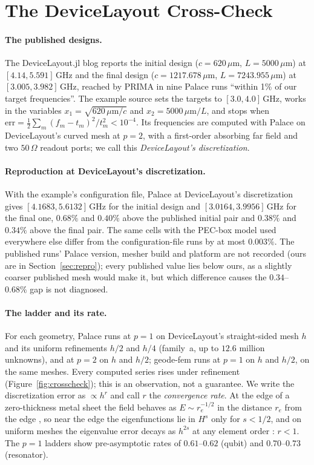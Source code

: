 \documentclass{anvil-paper}
\begin{document}
\section{The DeviceLayout Cross-Check}
\label{sec:crosscheck}

\paragraph{The published designs.}
The DeviceLayout.jl blog \citep{devicelayout-blog} reports the initial
design ($c = 620\,\mu$m, $L = 5000\,\mu$m) at $[4.14, 5.591]$\,GHz and
the final design ($c = 1217.678\,\mu$m, $L = 7243.955\,\mu$m) at
$[3.005, 3.982]$\,GHz, reached by PRIMA in nine Palace runs ``within 1\% of
our target frequencies''. The example source \citep{devicelayout-example}
sets the targets to $[3.0, 4.0]$\,GHz, works in the variables $x_1 =
\sqrt{620\,\mu\mathrm{m}/c}$ and $x_2 = 5000\,\mu\mathrm{m}/L$, and stops
when $\mathrm{err} = \frac12\sum_m (f_m - t_m)^2/t_m^2 < 10^{-4}$. Its
frequencies are computed with Palace on DeviceLayout's curved mesh at
$p = 2$, with a first-order absorbing far field and two
$50\,\Omega$ readout ports; we call this \emph{DeviceLayout's
discretization}.

\paragraph{Reproduction at DeviceLayout's discretization.}
With the example's configuration file, Palace at DeviceLayout's
discretization gives $[4.1683, 5.6132]$\,GHz for the initial design
and $[3.0164, 3.9956]$\,GHz for the final one, $0.68\%$ and $0.40\%$
above the published initial pair and $0.38\%$ and $0.34\%$ above the
final pair. The same cells with the PEC-box model used everywhere else
differ from the configuration-file runs by at most $0.003\%$. The
published runs' Palace version, mesher build and platform are not
recorded (ours are in Section~\ref{sec:repro}); every published value lies
below ours, as a slightly coarser published mesh would make it, but which
difference causes the $0.34$--$0.68\%$ gap is not diagnosed.

\paragraph{The ladder and its rate.}
For each geometry, Palace runs at $p = 1$ on DeviceLayout's straight-sided
mesh $h$ and its uniform refinements $h/2$ and $h/4$ (family~a, up to
$12.6$ million unknowns), and at $p = 2$ on $h$ and $h/2$;
geode-fem runs at $p = 1$ on $h$ and $h/2$, on the same meshes. Every
computed series rises under refinement (Figure~\ref{fig:crosscheck}); this
is an observation, not a guarantee. We write the discretization error as
$\propto h^{r}$ and call $r$ the \emph{convergence rate}. At the edge of a
zero-thickness metal sheet the field behaves as $E \sim r_e^{-1/2}$ in the
distance $r_e$ from the edge \citep{meixner1972behavior},
so near the edge the eigenfunctions lie in $H^{s}$ only for $s < 1/2$, and
on uniform meshes the eigenvalue error decays as $h^{2s}$ at any element
order \citep{boffi2010finite}: $r < 1$. The $p = 1$
ladders show pre-asymptotic rates of $0.61$--$0.62$ (qubit) and $0.70$--$0.73$
(resonator).
\end{document}
